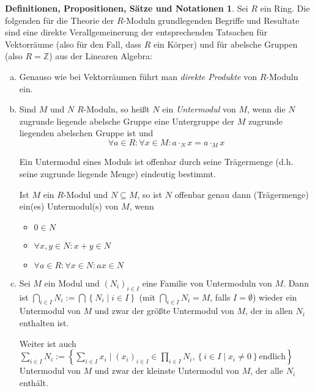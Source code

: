 \documentclass[
twoside=semi,
fontsize=12,
DIV=12, 
cleardoublepage=current,
leqno,
headings=optiontoheadandtoc, 
toc=idx
]{scrbook}
\newcommand{\Z}{\mathbb{Z}}
\newcommand{\set}[1]{\left\{ #1 \right\}}
\theoremstyle{definition}
\newtheorem{def-prop-satz-not}[definition]{Definitionen, Propositionen, S\"atze und Notationen}
\begin{document}
	\begin{def-prop-satz-not}\label{1.1.4}\hfill\newline
		Sei $R$ ein Ring. Die folgenden f\"ur die Theorie der $R$-Moduln grundlegenden Begriffe und Resultate sind eine direkte Verallgemeinerung der entsprechenden Tatsachen f\"ur Vektorr\"aume (also f\"ur den Fall, dass $R$ ein K\"orper) und f\"ur abelsche Gruppen (also $R = \Z$) aus der Linearen Algebra:
		
		\begin{enumerate}[(a)]
			\item Genauso wie bei Vektorr\"aumen f\"uhrt man \emph{direkte Produkte} von $R$-Moduln ein.
			
			\item Sind $M$ und $N$ $R$-Moduln, so hei\ss t $N$ ein \emph{Untermodul} von $M$, wenn die $N$ zugrunde liegende abelsche Gruppe eine Untergruppe der $M$ zugrunde liegenden abelschen Gruppe ist und 
			\[\forall a \in R: \forall x \in M: a \cdot_N x = a \cdot_M x\]
			
			Ein Untermodul eines Moduls ist offenbar durch seine Tr\"agermenge (d.h. seine zugrunde liegende Menge) eindeutig bestimmt.
			
			Ist $M$ ein $R$-Modul und $N \subseteq M$, so ist $N$ offenbar genau dann (Tr\"agermenge) ein(es) Untermodul(s) von $M$, wenn 
			\begin{itemize}
				\item $0\in N$
				\item $\forall x, y \in N: x + y \in N$
				\item $\forall a \in R: \forall x \in N: ax \in N$
			\end{itemize}
			
			\item Sei $M$ ein Modul und $(N_i)_{i \in I}$ eine Familie von Untermoduln von $M$. Dann ist 
			$\displaystyle \bigcap_{i \in I} N_i := \bigcap \set{N_i \mid i \in I}$ (mit $\displaystyle \bigcap_{i \in I} N_i = M$, falls $I = \emptyset$)
			wieder ein Untermodul von $M$ und zwar der gr\"o\ss te Untermodul von $M$, der in allen $N_i$ enthalten ist.
			
			Weiter ist auch $\displaystyle \sum_{i \in I} N_i := \set{\sum_{i \in I} x_i \mid (x_i)_{i \in I} \in \prod_{i\in I} N_i, \set{i \in I \mid x_i \neq 0} \textrm{endlich}}$ Untermodul von $M$ und zwar der kleinste Untermodul von $M$, der alle $N_i$ enth\"alt.
			

\end{enumerate}
\end{def-prop-satz-not}
\end{document}
